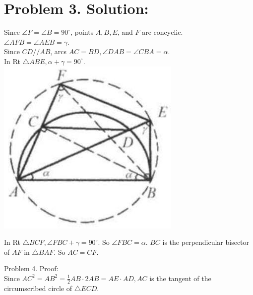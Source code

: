 \documentclass[10pt]{article}
\begin{document}
\section*{Problem 3. Solution:}
Since \(\angle F=\angle B=90^{\circ}\), points \(A, B, E\), and \(F\) are concyclic.\\
\(\angle A F B=\angle A E B=\gamma\).\\
Since \(C D / / A B\), arcs \(A C=B D, \angle D A B=\angle C B A=\alpha\).\\
In Rt \(\triangle A B E, \alpha+\gamma=90^{\circ}\).\\
\includegraphics[max width=\textwidth, center]{2025_04_17_97bc1f7e44d93c271a88g-209}

In Rt \(\triangle B C F, \angle F B C+\gamma=90^{\circ}\). So \(\angle F B C=\alpha\). \(B C\) is the perpendicular bisector of \(A F\) in \(\triangle B A F\). So \(A C=C F\).

Problem 4. Proof:\\
Since \(A C^{2}=A B^{2}=\frac{1}{2} A B \cdot 2 A B=A E \cdot A D, A C\) is the tangent of the circumscribed circle of \(\triangle E C D\).
\end{document}
